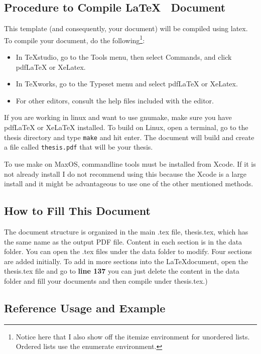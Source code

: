 \subsection{Procedure to Compile \LaTeX ~ Document}

This template (and consequently, your document) will be compiled using latex. To compile your document, do the following\footnote{Notice here that I also show off the itemize environment for unordered lists. Ordered lists use the enumerate environment.}:

\begin{itemize}
	\item In TeXstudio, go to the Tools menu, then select Commands, and click pdfLaTeX or XeLatex.
	\item In TeXworks, go to the Typeset menu and select pdfLaTeX or XeLatex.
	\item For other editors, consult the help files included with the editor.
\end{itemize}

If you are working in linux and want to use gnumake, make sure you have pdfLaTeX or XeLaTeX installed. To build on Linux, open a terminal, go to the
thesis directory and type \texttt{make} and hit enter. The document will build and create a file called \texttt{thesis.pdf} that will be your thesis.

To use make on MaxOS, commandline tools must be installed from Xcode. If it is not already install I do not recommend using this because
the Xcode is a large install and it might be advantageous to use one of the other mentioned methods.

\subsection{How to Fill This Document}
The document structure is organized in the main .tex file, thesis.tex,
which has the same name as the output PDF file. Content in each section is in the data folder. You can open the .tex files under the data folder to modify. Four sections
are added initially. To add in more sections into the \LaTeX document, open the
thesis.tex file and go to \textbf{line 137} you can just delete the content in the data folder and fill your documents and then compile under thesis.tex.)

\subsection{Reference Usage and Example}

